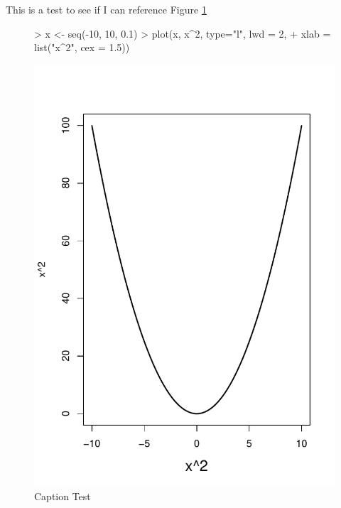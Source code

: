 \documentclass[10pt,a4paper]{book}
\begin{document}



This is a test to see if I can reference Figure \ref{Fig. 1}

\begin{figure}[ht]
  \centering
\begin{Schunk}
\begin{Sinput}
> x <- seq(-10, 10, 0.1)
> plot(x, x^2, type="l", lwd = 2,
+      xlab = list("x^2", cex = 1.5))
\end{Sinput}
\end{Schunk}
\includegraphics{TestAPB-x_y_squared}
\caption{Caption Test}
\label{Fig. 1}
\end{figure}
\end{document}
